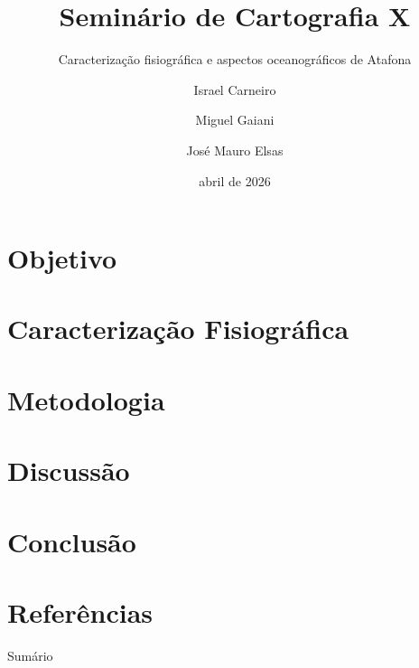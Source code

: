 \documentclass[aspectratio=169,11pt]{beamer}
\title[Sem. Cartografia X]{Seminário de Cartografia X}
\subtitle[Aspectos de Atafona]{Caracterização fisiográfica e aspectos oceanográficos de Atafona}
\author[Carneiro, Gaiani e Elsas]{Israel Carneiro \and Miguel Gaiani \and José Mauro Elsas}
\institute[UERJ]{UERJ -- Faculdade de Oceanografia}
\date{abril de 2026}
\begin{document}
\begin{frame}
\titlepage
\end{frame}

\section{Objetivo}
\section{Caracterização Fisiográfica}
\section{Metodologia}
\section{Discussão}
\section{Conclusão}
\section{Referências}

\begin{frame}{Sumário}
\tableofcontents
\end{frame}
\end{document}
